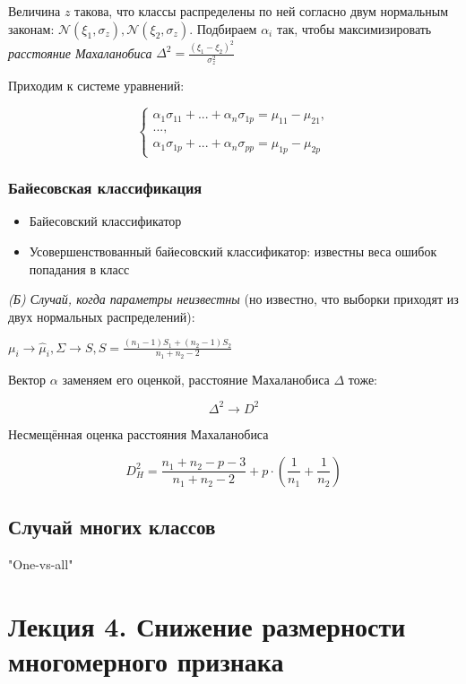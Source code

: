 \documentclass[main.tex]{subfiles}
\begin{document}
Величина $ z $ такова, что классы распределены по ней согласно двум нормальным законам: $ \mathcal{N}(\xi_1, \sigma_z), \mathcal{N}(\xi_2, \sigma_z) $.
Подбираем $ \alpha_i $ так, чтобы максимизировать \emph{расстояние Махаланобиса} $ \Delta^2 = \frac{(\xi_1 - \xi_2)^2}{\sigma_z^2} $

Приходим к системе уравнений:

\[
\begin{cases}
\alpha_1 \sigma_{11} + ... + \alpha_n \sigma_{1p} = \mu_{11} - \mu_{21}, \\
...,\\
\alpha_1 \sigma_{1p} + ... + \alpha_n \sigma_{pp} = \mu_{1p} - \mu_{2p}
\end{cases}
\] 

\subsubsection{Байесовская классификация}

\begin{itemize}[noitemsep]
	\item Байесовский классификатор
	\item Усовершенствованный байесовский классификатор: известны веса ошибок попадания в класс
\end{itemize}

\emph{(Б) Случай, когда параметры неизвестны} (но известно, что выборки приходят из двух нормальных распределений):

$ \mu_i \to \hat \mu_i, \Sigma \to S, S = \frac{(n_1 - 1) S_1 + (n_2 - 1) S_2}{n_1 + n_2 - 2} $

Вектор $ \alpha $ заменяем его оценкой, расстояние Махаланобиса $\Delta$ тоже:

$$ \Delta^2 \to D^2 $$

Несмещённая оценка расстояния Махаланобиса

$$ D^2_H = \frac{n_1 + n_2 - p - 3}{n_1 + n_2 - 2} + p \cdot \left(\frac{1}{n_1} + \frac{1}{n_2}\right) $$

\subsection{Случай многих классов}

"One-vs-all"

\section{Лекция 4. Снижение размерности многомерного признака}
\end{document}
